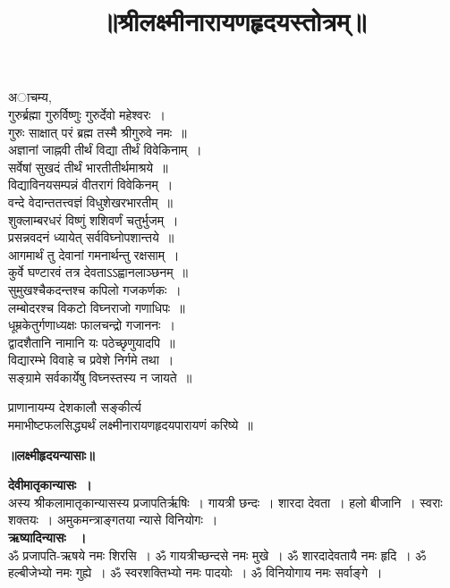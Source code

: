 \documentclass[twoside,top=1.7cm, bottom=1.7cm, outer=1cm,landscape, inner=1.5cm,a5paper,]{book}
\begin{document}
\LARGE
\frontmatter
\title{\Huge\bfseries ॥श्रीलक्ष्मीनारायणहृदयस्तोत्रम्॥}
\date{ }
	\begin{titlepage}
	\vfill
	\vfill
		\centering
		\maketitle
	\end{titlepage}
\begin{center}
अाचम्य,\\
गुरुर्ब्रह्मा गुरुर्विष्णुः गुरुर्देवो महेश्‍वरः~।\\
गुरुः साक्षात्‌ परं ब्रह्म तस्मै श्रीगुरुवे नमः~॥\\[10pt]
अज्ञानां जाह्नवी तीर्थं विद्या तीर्थं विवेकिनाम्~।\\
सर्वेषां सुखदं तीर्थं भारतीतीर्थमाश्रये~॥\\[10pt]
 विद्याविनयसम्पन्नं वीतरागं विवेकिनम्~।\\
 वन्दे वेदान्ततत्त्वज्ञं विधुशेखरभारतीम्~॥\\[10pt]
शुक्लाम्बरधरं विष्णुं शशिवर्णं चतुर्भुजम्~।\\
प्रसन्नवदनं ध्यायेत् सर्वविघ्नोपशान्तये~॥\\
आगमार्थं तु देवानां गमनार्थन्तु रक्षसाम्~।\\
कुर्वे घण्टारवं तत्र देवताऽऽह्वानलाञ्छनम्~॥\\
सुमुखश्चैकदन्तश्च कपिलो गजकर्णकः~।\\
लम्बोदरश्च विकटो विघ्नराजो गणाधिपः~॥\\
धूम्रकेतुर्गणाध्यक्षः फालचन्द्रो गजाननः~।\\
द्वादशैतानि नामानि यः पठेच्छृणुयादपि~॥\\
विद्यारम्भे विवाहे च प्रवेशे निर्गमे तथा~।\\
सङ्ग्रामे सर्वकार्येषु विघ्नस्तस्य न जायते~॥\\
\end{center}
प्राणानायम्य देशकालौ सङ्कीर्त्य\\
 ममाभीष्टफलसिद्ध्यर्थं लक्ष्मीनारायणहृदयपारायणं करिष्ये~॥
\begin{center}{\bfseries\LARGE ॥लक्ष्मीहृदयन्यासाः॥}\end{center}
{\bfseries देवीमातृकान्यासः~।}\\
अस्य श्रीकलामातृकान्यासस्य प्रजापतिर्ऋषिः~। गायत्री छन्दः~। शारदा देवता~। हलो बीजानि~। स्वराः शक्तयः~। अमुकमन्त्राङ्गतया न्यासे विनियोगः~।\\
{\bfseries ऋष्यादिन्यासः ~।}\\
ॐ प्रजापति-ऋषये नमः शिरसि~। ॐ गायत्रीच्छन्दसे नमः मुखे~। ॐ शारदादेवतायै नमः हृदि~। ॐ हल्बीजेभ्यो नमः गुह्ये~। ॐ स्वरशक्तिभ्यो नमः पादयोः~। ॐ विनियोगाय नमः सर्वाङ्गे~।
\end{document}
